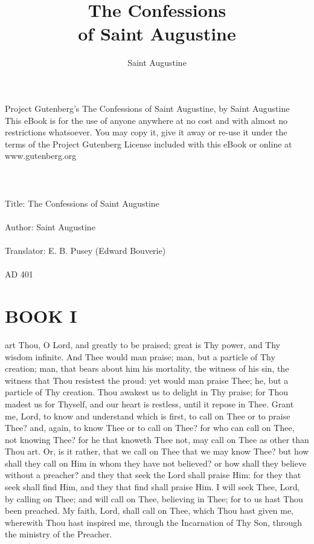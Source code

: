 \documentclass[b5paper,openright,12pt,twoside]{book}
\title{The Confessions \\of Saint Augustine}
\author{Saint Augustine}
\begin{document}
\pagestyle{empty}
\frontmatter
\maketitle
{}
\noindent
Project Gutenberg's The Confessions of Saint Augustine, by Saint Augustine
\\
\noindent
This eBook is for the use of anyone anywhere at no cost and with
almost no restrictions whatsoever.  You may copy it, give it away or
re-use it under the terms of the Project Gutenberg License included
with this eBook or online at www.gutenberg.org
\\
\\
\\
\\
\noindent
Title: The Confessions of Saint Augustine
\\
\\
\noindent
Author: Saint Augustine
\\
\\
\noindent
Translator: E. B. Pusey (Edward Bouverie)
\\
\\
\noindent
AD 401

\tableofcontents

\chapter{BOOK I}
\setcounter{page}{1}

 art Thou, O Lord, and greatly to be praised; great is Thy power,
and Thy wisdom infinite. And Thee would man praise; man, but a particle
of Thy creation; man, that bears about him his mortality, the witness of
his sin, the witness that Thou resistest the proud: yet would man praise
Thee; he, but a particle of Thy creation. Thou awakest us to delight in
Thy praise; for Thou madest us for Thyself, and our heart is restless,
until it repose in Thee. Grant me, Lord, to know and understand which is
first, to call on Thee or to praise Thee? and, again, to know Thee or
to call on Thee? for who can call on Thee, not knowing Thee? for he that
knoweth Thee not, may call on Thee as other than Thou art. Or, is it
rather, that we call on Thee that we may know Thee? but how shall they
call on Him in whom they have not believed? or how shall they believe
without a preacher? and they that seek the Lord shall praise Him: for
they that seek shall find Him, and they that find shall praise Him.
I will seek Thee, Lord, by calling on Thee; and will call on Thee,
believing in Thee; for to us hast Thou been preached. My faith, Lord,
shall call on Thee, which Thou hast given me, wherewith Thou hast
inspired me, through the Incarnation of Thy Son, through the ministry of
the Preacher.
\end{document}
